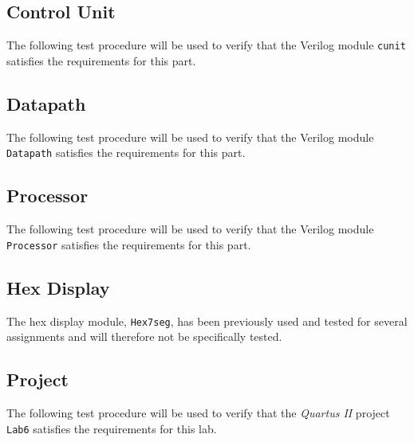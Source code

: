 \subsection{Control Unit} %
\label{sub:control_unit}

The following test procedure will be used to verify that the Verilog module \verb|cunit| satisfies
the requirements for this part.



\subsection{Datapath} %
\label{sub:datapath}

The following test procedure will be used to verify that the Verilog module \verb|Datapath| satisfies
the requirements for this part.



\subsection{Processor} %
\label{sub:processor}

The following test procedure will be used to verify that the Verilog module \verb|Processor| satisfies
the requirements for this part.



\subsection{Hex Display} %
\label{sub:hex_display}

The hex display module, \verb|Hex7seg|, has been previously used and tested for several assignments and will therefore not be specifically tested.

\subsection{Project} %
\label{sub:project}

The following test procedure will be used to verify that the \emph{Quartus II} project \verb|Lab6| satisfies
the requirements for this lab.

